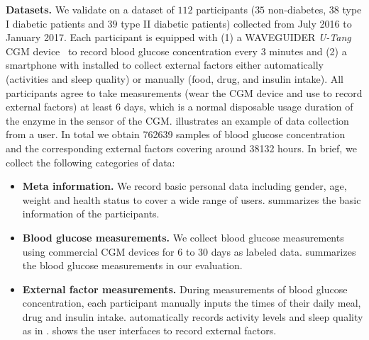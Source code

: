 \textbf{Datasets.}
We validate \sysname on a dataset of $112$ participants ($35$ non-diabetes, $38$ type I diabetic patients and $39$ type II diabetic patients) collected from July 2016 to January 2017.
Each participant is equipped with (1) a WAVEGUIDER \emph{U-Tang} CGM device~\cite{bib:CGM_wave} to record blood glucose concentration every $3$ minutes and (2) a smartphone with \sysname installed to collect external factors either automatically (activities and sleep quality) or manually (food, drug, and insulin intake).
All participants agree to take measurements (\ie wear the CGM device and use \sysname to record external factors) at least $6$ days, which is a normal disposable usage duration of the enzyme in the sensor of the CGM.
 illustrates an example of data collection from a user.
In total we obtain 762639 samples of blood glucose concentration and the corresponding external factors covering around 38132 hours.
In brief, we collect the following categories of data:
\begin{itemize}
  \item
  \textbf{Meta information.}
  We record basic personal data including gender, age, weight and health status to cover a wide range of users.
   summarizes the basic information of the participants.
  \item
  \textbf{Blood glucose measurements.}
  We collect blood glucose measurements using commercial CGM devices for $6$ to $30$ days as labeled data.
   summarizes the blood glucose measurements in our evaluation.
  \item
  \textbf{External factor measurements.}
  During measurements of blood glucose concentration, each participant manually inputs the times of their daily meal, drug and insulin intake.
  \sysname automatically records activity levels and sleep quality as in .
   shows the user interfaces to record external factors.
\end{itemize}

